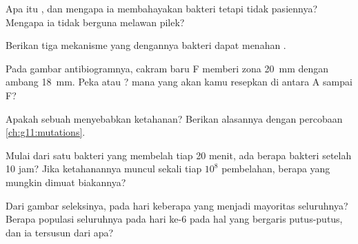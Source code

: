 \begin{exercise}[$\star$]\label{exo:g11:antibiotic-resistance:2}
Apa itu , dan mengapa ia membahayakan bakteri tetapi tidak
 pasiennya? Mengapa ia tidak berguna melawan pilek?
\end{exercise}

\begin{exercise}[$\star$]\label{exo:g11:antibiotic-resistance:3}
Berikan tiga mekanisme yang dengannya bakteri dapat menahan .
\end{exercise}

\begin{exercise}[$\star$]\label{exo:g11:antibiotic-resistance:4}
Pada gambar antibiogramnya, cakram baru F memberi zona
\qty{20}{mm} dengan ambang \qty{18}{mm}. Peka atau ? 
mana yang akan kamu resepkan di antara A sampai F?
\end{exercise}

\begin{exercise}[$\star$]\label{exo:g11:antibiotic-resistance:5}
Apakah sebuah  menyebabkan  ketahanan? Berikan
alasannya dengan percobaan \cref{ch:g11:mutations}.
\end{exercise}

\begin{exercise}[$\star\star$]\label{exo:g11:antibiotic-resistance:6}
Mulai dari satu bakteri yang membelah tiap 20 menit, ada berapa bakteri
setelah 10 jam? Jika ketahanannya muncul sekali tiap $10^8$ pembelahan,
berapa   yang mungkin dimuat biakannya?
\end{exercise}

\begin{exercise}[$\star\star$]\label{exo:g11:antibiotic-resistance:7}
Dari gambar seleksinya, pada hari keberapa  yang  menjadi
mayoritas seluruhnya? Berapa populasi seluruhnya pada hari ke-6 pada
hal yang bergaris putus-putus, dan ia tersusun dari apa?
\end{exercise}

